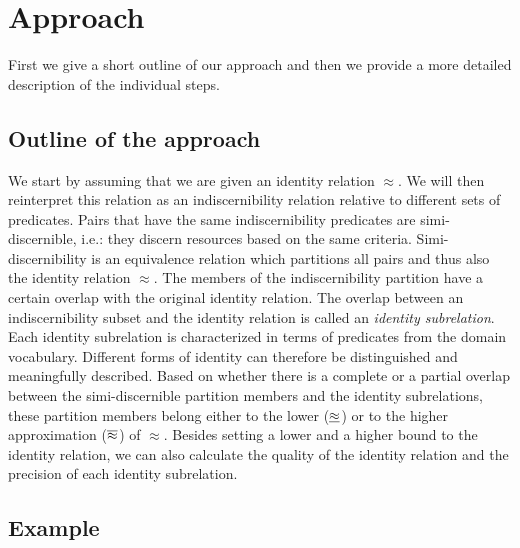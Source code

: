 \section{Approach}
\label{sec:approach}

First we give a short outline of our approach and then
  we provide a more detailed description of the individual steps.

\subsection{Outline of the approach}

We start by assuming that we are given an identity relation $\approx$.
We will then reinterpret this relation as an indiscernibility relation
  relative to different sets of predicates.
Pairs that have the same indiscernibility predicates
  are simi-discernible, i.e.: they discern resources
  based on the same criteria.
Simi-discernibility is an equivalence relation
  which partitions all pairs and thus also the identity relation $\approx$.
The members of the indiscernibility partition
  have a certain overlap with the original identity relation.
The overlap between an indiscernibility subset and the identity relation
  is called an \emph{identity subrelation}.
Each identity subrelation is characterized in terms of predicates
  from the domain vocabulary.
Different forms of identity can therefore be distinguished
  and meaningfully described.
Based on whether there is a complete or a partial overlap
  between the simi-discernible partition members and
  the identity subrelations,
  these partition members belong either to the lower ($\underline{\approx}$)
  or to the higher approximation ($\overline{\approx}$) of $\approx$.
Besides setting a lower and a higher bound to the identity relation,
  we can also calculate the quality of the identity relation
  and the precision of each identity subrelation.





\subsection{Example}

